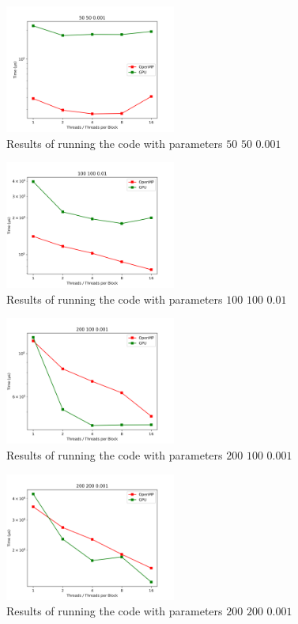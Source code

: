 \documentclass[12pt]{article}
\begin{document}
\begin{figure}[H]
	\centering
	\includegraphics[width=0.5\textwidth]{./images/Q5/50500001.png}	
	\cprotect\caption{Results of running the code with parameters $50$ $50$ $0.001$}
	\label{fig:5-2}
\end{figure}

\begin{figure}[H]
	\centering
	\includegraphics[width=0.5\textwidth]{./images/Q5/100100001.png}	
	\cprotect\caption{Results of running the code with parameters $100$ $100$ $0.01$}
	\label{fig:5-3}
\end{figure}


\begin{figure}[H]
	\centering
	\includegraphics[width=0.5\textwidth]{./images/Q5/2001000001.png}	
	\cprotect\caption{Results of running the code with parameters $200$ $100$ $0.001$}
	\label{fig:5-4}
\end{figure}

\begin{figure}[H]
	\centering
	\includegraphics[width=0.5\textwidth]{./images/Q5/2002000001.png}	
	\cprotect\caption{Results of running the code with parameters $200$ $200$ $0.001$}
	\label{fig:5-5}
\end{figure}
\end{document}
